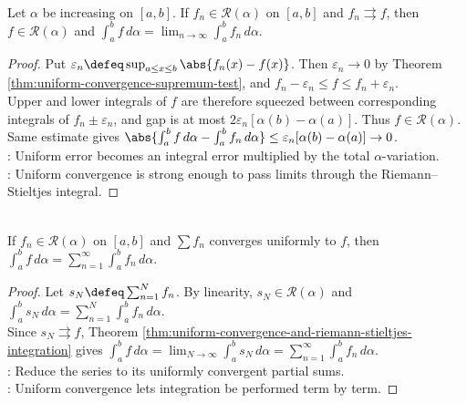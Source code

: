 \begin{theorem} \label{thm:uniform-convergence-and-riemann-stieltjes-integration} \\
Let $\alpha$ be increasing on $[a,b]$. If $f_n\in\mathcal{R}(\alpha)$ on $[a,b]$ and $f_n\rightrightarrows f$, then $f\in\mathcal{R}(\alpha)$ and $\int_a^b f\,d\alpha=\lim_{n\to\infty}\int_a^b f_n\,d\alpha$.
\begin{proof}
Put $\varepsilon_n\defeq\sup_{a\leq x\leq b}\abs{f_n(x)-f(x)}$. Then $\varepsilon_n\to0$ by Theorem \ref{thm:uniform-convergence-supremum-test}, and $f_n-\varepsilon_n\leq f\leq f_n+\varepsilon_n$.\\
Upper and lower integrals of $f$ are therefore squeezed between corresponding integrals of $f_n\pm\varepsilon_n$, and gap is at most $2\varepsilon_n[\alpha(b)-\alpha(a)]$. Thus $f\in\mathcal{R}(\alpha)$. Same estimate gives $\abs{\int_a^b f\,d\alpha-\int_a^b f_n\,d\alpha}\leq \varepsilon_n[\alpha(b)-\alpha(a)]\to0$.\\
: Uniform error becomes an integral error multiplied by the total $\alpha$-variation.\\
: Uniform convergence is strong enough to pass limits through the Riemann--Stieltjes integral.
\end{proof}
\end{theorem}

\begin{corollary} \label{cor:termwise-riemann-stieltjes-integration} \\
If $f_n\in\mathcal{R}(\alpha)$ on $[a,b]$ and $\sum f_n$ converges uniformly to $f$, then $\int_a^b f\,d\alpha=\sum\limits_{n=1}^{\infty}\int_a^b f_n\,d\alpha$.
\begin{proof}
Let $s_N\defeq\sum_{n=1}^{N}f_n$. By linearity, $s_N\in\mathcal{R}(\alpha)$ and $\int_a^b s_N\,d\alpha=\sum_{n=1}^{N}\int_a^b f_n\,d\alpha$.\\
Since $s_N\rightrightarrows f$, Theorem \ref{thm:uniform-convergence-and-riemann-stieltjes-integration} gives $\int_a^b f\,d\alpha=\lim_{N\to\infty}\int_a^b s_N\,d\alpha=\sum\limits_{n=1}^{\infty}\int_a^b f_n\,d\alpha$.\\
: Reduce the series to its uniformly convergent partial sums.\\
: Uniform convergence lets integration be performed term by term.
\end{proof}
\end{corollary}

